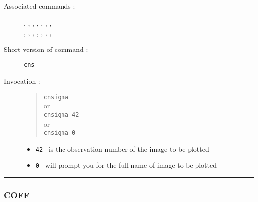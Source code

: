 \begin{description}
\item[Associated commands :] {\tt {}}, 
{\tt {}}, {\tt {}}, 
{\tt {}}, {\tt {}}, 
{\tt {}}, {\tt {}}, \\ 
{\tt {}}, {\tt {}}, 
{\tt {}}, {\tt {}}, 
{\tt {}}, {\tt {}}, 
{\tt {}}, {\tt {}}

\item[Short version of command :] {\tt cns}
\item[Invocation :]

\begin{quote}{\tt  cnsigma }\\
or \\
{\tt cnsigma 42 }\\
or \\
{\tt  cnsigma 0 }
\end{quote}

\begin{itemize}
\item {\tt 42 } is the observation number of the image to be plotted
\item {\tt 0 } will prompt you for the full name of image to be plotted
\end{itemize}

\end{description}

\hrule 
\subsubsection*{\label{COFF}COFF}

